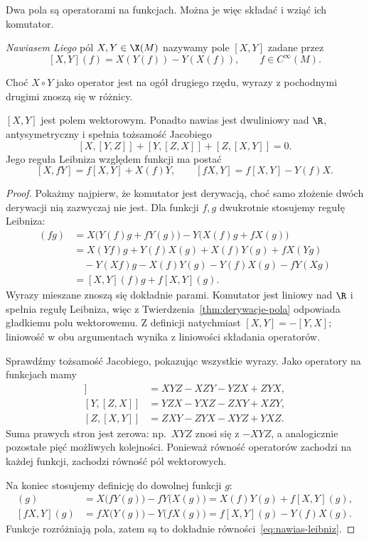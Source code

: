 Dwa pola są operatorami na funkcjach. Można je więc składać i wziąć
ich komutator.
\begin{definicja}
\emph{Nawiasem Liego} pól $X,Y\in\X(M)$ nazywamy pole $[X,Y]$ zadane przez
\begin{equation}\label{eq:nawias-def}
 [X,Y](f)=X(Y(f))-Y(X(f)),\qquad f\in C^\infty(M).
\end{equation}
\end{definicja}

Choć $X\circ Y$ jako operator jest na ogół drugiego rzędu, wyrazy z
pochodnymi drugimi znoszą się w różnicy.
\begin{fakt}\label{fakt:nawias-wlasnosci}
$[X,Y]$ jest polem wektorowym. Ponadto nawias jest dwuliniowy nad $\R$,
antysymetryczny i spełnia tożsamość Jacobiego
\[
 [X,[Y,Z]]+[Y,[Z,X]]+[Z,[X,Y]]=0.
\]
Jego reguła Leibniza względem funkcji ma postać
\begin{equation}\label{eq:nawias-leibniz}
 [X,fY]=f[X,Y]+X(f)Y,\qquad [fX,Y]=f[X,Y]-Y(f)X.
\end{equation}
\end{fakt}
\begin{proof}
Pokażmy najpierw, że komutator jest derywacją, choć samo
złożenie dwóch derywacji nią zazwyczaj nie jest.
Dla funkcji $f,g$ dwukrotnie stosujemy regułę Leibniza:
\begin{align*}
[X,Y](fg)
&=X\bigl(Y(f)g+fY(g)\bigr)
  -Y\bigl(X(f)g+fX(g)\bigr)\\
&=X(Yf)g+Y(f)X(g)+X(f)Y(g)+fX(Yg)\\
&\quad-Y(Xf)g-X(f)Y(g)-Y(f)X(g)-fY(Xg)\\
&=[X,Y](f)g+f[X,Y](g).
\end{align*}
Wyrazy mieszane znoszą się dokładnie parami. Komutator
jest liniowy nad $\R$ i spełnia regułę Leibniza,
więc z Twierdzenia~\ref{thm:derywacje-pola} odpowiada
gładkiemu polu wektorowemu. Z definicji natychmiast
$[X,Y]=-[Y,X]$; liniowość w obu argumentach wynika
z liniowości składania operatorów.

Sprawdźmy tożsamość Jacobiego, pokazując wszystkie
wyrazy. Jako operatory na funkcjach mamy
\begin{align*}
[X,[Y,Z]]&=XYZ-XZY-YZX+ZYX,\\
[Y,[Z,X]]&=YZX-YXZ-ZXY+XZY,\\
[Z,[X,Y]]&=ZXY-ZYX-XYZ+YXZ.
\end{align*}
Suma prawych stron jest zerowa: np.\ $XYZ$ znosi się
z $-XYZ$, a analogicznie pozostałe pięć możliwych
kolejności. Ponieważ równość operatorów zachodzi na
każdej funkcji, zachodzi równość pól wektorowych.

Na koniec stosujemy definicję do dowolnej funkcji $g$:
\begin{align*}
[X,fY](g)
 &=X\bigl(fY(g)\bigr)-fY\bigl(X(g)\bigr)
  =X(f)Y(g)+f[X,Y](g),\\
[fX,Y](g)
 &=fX\bigl(Y(g)\bigr)-Y\bigl(fX(g)\bigr)
  =f[X,Y](g)-Y(f)X(g).
\end{align*}
Funkcje rozróżniają pola, zatem są to dokładnie
równości~\eqref{eq:nawias-leibniz}.
\end{proof}

